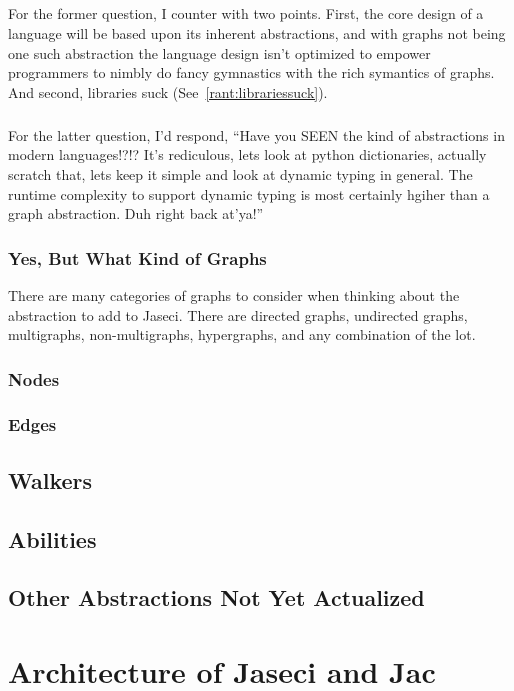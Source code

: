 \documentclass{book}
\begin{document}
\paragraph{}
For the former question, I counter with two points. First, the core design of a language will be based upon its inherent abstractions, and with graphs not being one such abstraction the language design isn't optimized to empower programmers to nimbly do fancy gymnastics with the rich symantics of graphs. And second, libraries suck (See~\ref{rant:librariessuck}).
\paragraph{}
For the latter question, I'd respond, ``Have you SEEN the kind of abstractions in modern languages!?!? It's rediculous, lets look at python dictionaries, actually scratch that, lets keep it simple and look at dynamic typing in general. The runtime complexity to support dynamic typing is most certainly hgiher than a graph abstraction. Duh right back at'ya!''
\subsection{Yes, But What Kind of Graphs}
There are many categories of graphs to consider when thinking about the abstraction to add to Jaseci. There are \gls{directed graphs}, \gls{undirected graphs}, \gls{multigraphs}, non-multigraphs, \gls{hypergraphs}, and any combination of the lot.
\subsection{Nodes}
\subsection{Edges}

\section{Walkers}
\section{Abilities}
\section{Other Abstractions Not Yet Actualized}

\chapter{Architecture of Jaseci and Jac}
\end{document}
